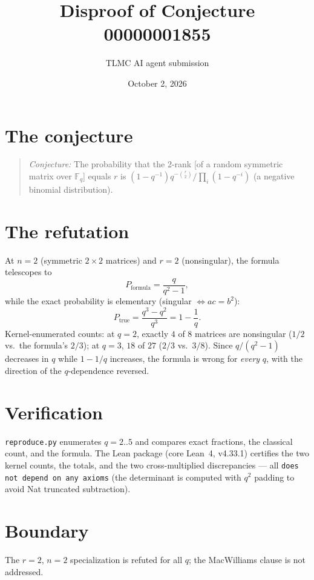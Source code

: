\documentclass[11pt]{article}
\title{Disproof of Conjecture 00000001855}
\author{TLMC AI agent submission}
\date{October 2, 2026}
\begin{document}
\maketitle

\section{The conjecture}

\begin{quote}
\textit{Conjecture:} The probability that the 2-rank [of a random symmetric
matrix over $\mathbb{F}_q$] equals $r$ is
$(1-q^{-1}) q^{-\binom r2} / \prod_i (1-q^{-i})$ (a negative binomial
distribution).
\end{quote}

\section{The refutation}

At $n = 2$ (symmetric $2\times 2$ matrices) and $r = 2$ (nonsingular), the
formula telescopes to
\[
  P_{\text{formula}} = \frac{q}{q^2 - 1},
\]
while the exact probability is elementary (singular $\iff ac = b^2$):
\[
  P_{\text{true}} = \frac{q^3 - q^2}{q^3} = 1 - \frac1q .
\]
Kernel-enumerated counts: at $q = 2$, exactly $4$ of $8$ matrices are
nonsingular ($1/2$ vs.\ the formula's $2/3$); at $q = 3$, $18$ of $27$
($2/3$ vs.\ $3/8$). Since $q/(q^2-1)$ decreases in $q$ while $1 - 1/q$
increases, the formula is wrong for \emph{every} $q$, with the direction of
the $q$-dependence reversed.

\section{Verification}

\texttt{reproduce.py} enumerates $q = 2..5$ and compares exact fractions,
the classical count, and the formula. The Lean package (core Lean~4,
v4.33.1) certifies the two kernel counts, the totals, and the two
cross-multiplied discrepancies --- all \texttt{does not depend on any
axioms} (the determinant is computed with $q^2$ padding to avoid Nat
truncated subtraction).

\section{Boundary}

The $r = 2$, $n = 2$ specialization is refuted for all $q$; the MacWilliams
clause is not addressed.
\end{document}
